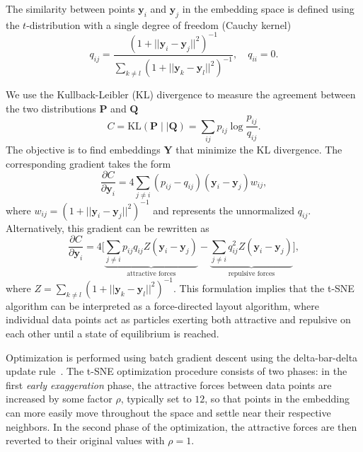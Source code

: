 \documentclass[article]{jss}
\begin{document}
The similarity between points $\mathbf{y}_i$ and $\mathbf{y}_j$ in the embedding
space is defined using the $t$-distribution with a single degree of freedom
(Cauchy kernel)
\begin{equation}
q_{ij} = \frac{\left ( 1 + || \mathbf{y}_i - \mathbf{y}_j ||^2 \right )^{-1}}
{\sum_{k \neq l}\left ( 1 + || \mathbf{y}_k - \mathbf{y}_l ||^2 \right )^{-1}},
\quad q_{ii} = 0.
\label{eq:cauchy_kernel}
\end{equation}

We use the Kullback-Leibler (KL) divergence to measure the agreement
between the two distributions $\mathbf{P}$ and $\mathbf{Q}$
\begin{equation}
C = \text{KL}(\mathbf{P} \mid \mid \mathbf{Q}) = \sum_{ij} p_{ij} \log \frac{p_{ij}}{q_{ij}}.
\label{eq:kl_divergence}
\end{equation}
The objective is to find embeddings $\mathbf{Y}$ that minimize the KL divergence. The corresponding gradient takes the form
\begin{equation}
\frac{\partial C}{\partial \mathbf{y}_i} = 4 \sum_{j \neq i} \left ( p_{ij} - q_{ij} \right ) \left ( \mathbf{y}_i - \mathbf{y}_j \right ) w_{ij},
\label{eq:tsne_gradient}
\end{equation}
where $w_{ij} = \left ( 1 + || \mathbf{y}_i - \mathbf{y}_j || ^2 \right )^{-1}$
and represents the unnormalized $q_{ij}$.
Alternatively, this gradient can be rewritten as
\begin{equation}
\frac{\partial C}{\partial \mathbf{y}_i} = 4 \Bigg [
\underbrace{\sum_{j \neq i} p_{ij} q_{ij} Z \left ( \mathbf{y}_i - \mathbf{y}_j \right )}_{\text{attractive forces}}  -
\underbrace{\sum_{j \neq i} q_{ij}^2 Z \left ( \mathbf{y}_i - \mathbf{y}_j \right )}_{\text{repulsive forces}}
\Bigg ], \label{eq:grad_attr_rep}
\end{equation}
where $Z = \sum_{k \neq l}\left ( 1 + || \mathbf{y}_k - \mathbf{y}_l ||^2 \right )^{-1}$. This formulation implies that the t-SNE algorithm can be interpreted as a force-directed layout algorithm, where individual data points act as particles exerting both attractive and repulsive on each other until a state of equilibrium is reached.

Optimization is performed using batch gradient descent using the delta-bar-delta update rule~\citep{jacobs1988increased}. The t-SNE optimization procedure consists of two phases: in the first \textit{early exaggeration} phase, the attractive forces between data points are increased by some factor $\rho$, typically set to $12$, so that points in the embedding can more easily move throughout the space and settle near their respective neighbors. In the second phase of the optimization, the attractive forces are then reverted to their original values with $\rho=1$.
\end{document}
